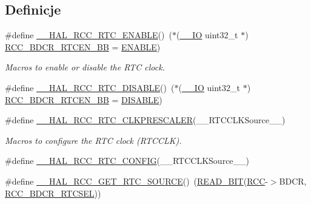 \subsection*{Definicje}
\begin{DoxyCompactItemize}
\item 
\#define \hyperlink{group___r_c_c___internal___r_t_c___clock___configuration_gab7cc36427c31da645a0e38e181f8ce0f}{\+\_\+\+\_\+\+H\+A\+L\+\_\+\+R\+C\+C\+\_\+\+R\+T\+C\+\_\+\+E\+N\+A\+B\+LE}()~($\ast$(\hyperlink{core__sc300_8h_aec43007d9998a0a0e01faede4133d6be}{\+\_\+\+\_\+\+IO} uint32\+\_\+t $\ast$) \hyperlink{group___r_c_c___bit_address___alias_region_ga583ba8653153b48a06473d0a331f781d}{R\+C\+C\+\_\+\+B\+D\+C\+R\+\_\+\+R\+T\+C\+E\+N\+\_\+\+BB} = \hyperlink{group___exported__types_ggac9a7e9a35d2513ec15c3b537aaa4fba1a7d46875fa3ebd2c34d2756950eda83bf}{E\+N\+A\+B\+LE})
\begin{DoxyCompactList}\small\item\em Macros to enable or disable the R\+TC clock. \end{DoxyCompactList}\item 
\#define \hyperlink{group___r_c_c___internal___r_t_c___clock___configuration_gaab5eeb81fc9f0c8d4450069f7a751855}{\+\_\+\+\_\+\+H\+A\+L\+\_\+\+R\+C\+C\+\_\+\+R\+T\+C\+\_\+\+D\+I\+S\+A\+B\+LE}()~($\ast$(\hyperlink{core__sc300_8h_aec43007d9998a0a0e01faede4133d6be}{\+\_\+\+\_\+\+IO} uint32\+\_\+t $\ast$) \hyperlink{group___r_c_c___bit_address___alias_region_ga583ba8653153b48a06473d0a331f781d}{R\+C\+C\+\_\+\+B\+D\+C\+R\+\_\+\+R\+T\+C\+E\+N\+\_\+\+BB} = \hyperlink{group___exported__types_ggac9a7e9a35d2513ec15c3b537aaa4fba1ad3a9df141be0ccf10389b640f492b26d}{D\+I\+S\+A\+B\+LE})
\item 
\#define \hyperlink{group___r_c_c___internal___r_t_c___clock___configuration_ga7e10e306e7d9f3cd59d30dcb2c9cf61d}{\+\_\+\+\_\+\+H\+A\+L\+\_\+\+R\+C\+C\+\_\+\+R\+T\+C\+\_\+\+C\+L\+K\+P\+R\+E\+S\+C\+A\+L\+ER}(\+\_\+\+\_\+\+R\+T\+C\+C\+L\+K\+Source\+\_\+\+\_\+)
\begin{DoxyCompactList}\small\item\em Macros to configure the R\+TC clock (R\+T\+C\+C\+LK). \end{DoxyCompactList}\item 
\#define \hyperlink{group___r_c_c___internal___r_t_c___clock___configuration_ga2b1e5349631886f29040d7a31c002718}{\+\_\+\+\_\+\+H\+A\+L\+\_\+\+R\+C\+C\+\_\+\+R\+T\+C\+\_\+\+C\+O\+N\+F\+IG}(\+\_\+\+\_\+\+R\+T\+C\+C\+L\+K\+Source\+\_\+\+\_\+)
\item 
\#define \hyperlink{group___r_c_c___internal___r_t_c___clock___configuration_gad40d00ff1c984ebd011ea9f6e7f93c44}{\+\_\+\+\_\+\+H\+A\+L\+\_\+\+R\+C\+C\+\_\+\+G\+E\+T\+\_\+\+R\+T\+C\+\_\+\+S\+O\+U\+R\+CE}()~(\hyperlink{group___exported__macro_ga822bb1bb9710d5f2fa6396b84e583c33}{R\+E\+A\+D\+\_\+\+B\+IT}(\hyperlink{group___peripheral__declaration_ga74944438a086975793d26ae48d5882d4}{R\+CC}-\/$>$B\+D\+CR, \hyperlink{group___peripheral___registers___bits___definition_gabe30dbd38f6456990ee641648bc05d40}{R\+C\+C\+\_\+\+B\+D\+C\+R\+\_\+\+R\+T\+C\+S\+EL}))

\end{DoxyCompactItemize}
